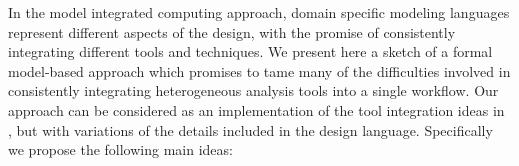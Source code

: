 
In the model integrated computing approach, domain specific modeling languages represent 
different aspects of the design, with the promise of consistently integrating different tools 
and techniques.  We present here a sketch of a formal model-based approach which promises to tame 
many of the difficulties involved in consistently integrating heterogeneous analysis tools into a 
single workflow.  Our approach can be considered as an implementation of the tool integration ideas 
in \cite{modeling:hybrid_abs}, but with variations of the details included in the design language.  
Specifically we propose the following main ideas:

